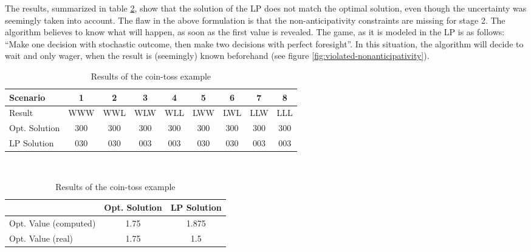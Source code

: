 \begin{example}
  The results, summarized in table \ref{tab:coin-toss-results}, show that the solution of the LP does not match the optimal solution, even though the uncertainty was seemingly taken into account.
  The flaw in the above formulation is that the non-anticipativity constraints are missing for stage 2.
  The algorithm believes to know what will happen, as soon as the first value is revealed.
  The game, as it is modeled in the LP is as follows:
  ``Make one decision with stochastic outcome, then make two decisions with perfect foresight''.
  In this situation, the algorithm will decide to wait and only wager, when the result is (seemingly) known beforehand (see figure \ref{fig:violated-nonanticipativity}).
  
  \begin{table}
    \small\centering
    \begin{tabular}{lcccccccc}
      \hline
      Scenario&1&2&3&4&5&6&7&8\\\hline\hline
      Result&WWW&WWL&WLW&WLL&LWW&LWL&LLW&LLL\\
      Opt. Solution&300&300&300&300&300&300&300&300\\
      LP Solution&030&030&003&003&030&030&003&003\\\hline
    \end{tabular}
    \vspace*{0.5cm}\\
    \begin{tabular}{lcc}
      \hline
      &Opt. Solution&LP Solution\\\hline\hline
      Opt. Value (computed)&1.75&1.875\\
      Opt. Value (real)&1.75&1.5\\
      \hline
    \end{tabular}
    \caption{Results of the coin-toss example}
    \label{tab:coin-toss-results}
  \end{table}
\end{example}


